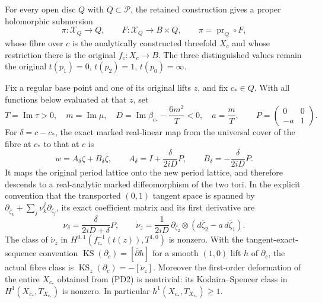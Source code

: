 \begin{theorem}
\label{wb:thm:retained-period-deformation}
For every open disc $Q$ with $\overline Q\subset\mathcal P$, the retained
construction gives a proper holomorphic submersion
\[
 \pi:\mathcal X_Q\longrightarrow Q,
 \qquad F:\mathcal X_Q\longrightarrow B\times Q,
 \qquad \pi=\operatorname{pr}_Q\circ F,
 \tag{PD2}
\]
whose fibre over $c$ is the analytically constructed threefold $X_c$ and
whose restriction there is the original $f_c:X_c\to B$.
The three distinguished values remain the original
$t(p_1)=0$, $t(p_2)=1$, $t(p_0)=\infty$.

Fix a regular base point and one of its original lifts $z$, and fix
$c_*\in Q$. With all functions below evaluated at that $z$, set
\[
 T=\operatorname{Im}\tau>0,\quad m=\operatorname{Im}\mu,\quad
 D=\operatorname{Im}\beta_{c_*}-\frac{6m^2}{T}<0,\quad a=\frac mT,
 \qquad P=\begin{pmatrix}0&0\\-a&1\end{pmatrix}.
 \tag{PD3}
\]
For $\delta=c-c_*$, the exact marked real-linear map from the universal
cover of the fibre at $c_*$ to that at $c$ is
\[
 w=A_\delta\zeta+B_\delta\overline\zeta,\qquad
 A_\delta=I+\frac{\delta}{2iD}P,\qquad
 B_\delta=-\frac{\delta}{2iD}P.
 \tag{PD4}
\]
It maps the original period lattice onto the new period lattice, and
therefore descends to a real-analytic marked diffeomorphism of the two
tori. In the explicit convention that the transported $(0,1)$ tangent
space is spanned by
$\partial_{\overline\zeta_k}+\sum_j\nu^j_k\partial_{\zeta_j}$,
its exact coefficient matrix and its first derivative are
\[
 \nu_\delta=\frac{\delta}{2iD+\delta}P,\qquad
 \dot\nu_z=\frac{1}{2iD}\,
 \partial_{\zeta_2}\otimes
 (d\overline\zeta_2-a\,d\overline\zeta_1).
 \tag{PD5}
\]
The class of $\dot\nu_z$ in
$H^{0,1}(f_{c_*}^{-1}(t(z)),T^{1,0})$ is nonzero.
With the tangent-exact-sequence convention
$\operatorname{KS}(\partial_c)=[\bar\partial h]$ for a smooth
$(1,0)$ lift $h$ of $\partial_c$, the actual fibre class is
$\operatorname{KS}_z(\partial_c)=-[\dot\nu_z]$.
Moreover the first-order deformation of the entire $X_{c_*}$ obtained
from (PD2) is nontrivial: its Kodaira--Spencer class in
$H^1(X_{c_*},T_{X_{c_*}})$ is nonzero. In particular
$h^1(X_{c_*},T_{X_{c_*}})\geq1$.
\end{theorem}

